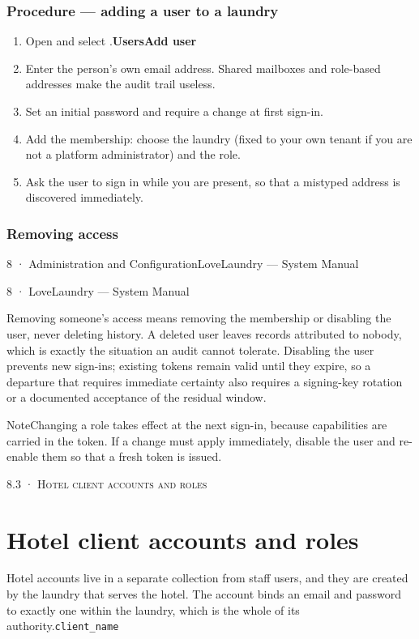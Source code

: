 \documentclass[11pt,a4paper,oneside]{book}
\begin{document}
\subsubsection*{Procedure — adding a user to a laundry}
\begin{enumerate}
\item Open  and select .\textbf{Users}\textbf{Add user}
\item Enter the person's own email address. Shared mailboxes and role-based addresses make the audit trail useless.
\item Set an initial password and require a change at first sign-in.
\item Add the membership: choose the laundry (fixed to your own tenant if you are not a platform administrator) and the role.
\item Ask the user to sign in while you are present, so that a mistyped address is discovered immediately.
\end{enumerate}
\subsubsection*{Removing access}
8 · Administration and ConfigurationLoveLaundry — System Manual

8 · LoveLaundry — System Manual

Removing someone's access means removing the membership or disabling the user, never deleting history. A deleted user leaves records attributed to nobody, which is exactly the situation an audit cannot tolerate. Disabling the user prevents new sign-ins; existing tokens remain valid until they expire, so a departure that requires immediate certainty also requires a signing-key rotation or a documented acceptance of the residual window.

\begin{notebox}NoteChanging a role takes effect at the next sign-in, because capabilities are carried in the token. If a change must apply immediately, disable the user and re-enable them so that a fresh token is issued.\end{notebox}
\textsc{\small\color{crimson}8.3 · Hotel client accounts and roles}\par\medskip
\section*{Hotel client accounts and roles}
Hotel accounts live in a separate collection from staff users, and they are created by the laundry that serves the hotel. The account binds an email and password to exactly one  within the laundry, which is the whole of its authority.\texttt{client\_name}
\end{document}
